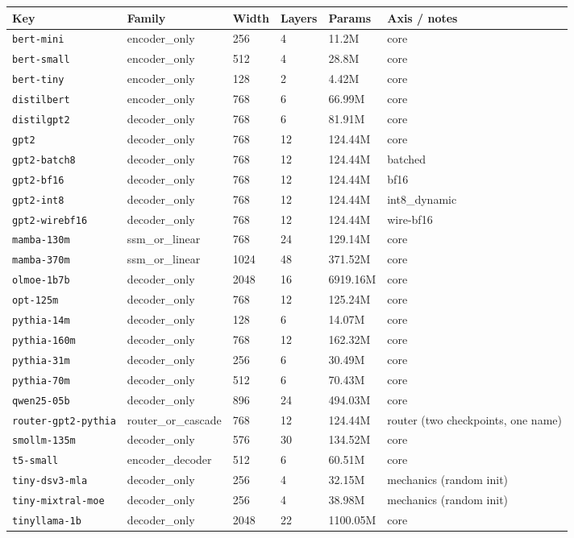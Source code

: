 \begin{tabularx}{\textwidth}{@{}l l l l l Y@{}}
\toprule
\textbf{Key} & \textbf{Family} & \textbf{Width} & \textbf{Layers} & \textbf{Params} & \textbf{Axis / notes}\\
\midrule
\texttt{bert-mini} & encoder\_only & 256 & 4 & 11.2M & core \\
\texttt{bert-small} & encoder\_only & 512 & 4 & 28.8M & core \\
\texttt{bert-tiny} & encoder\_only & 128 & 2 & 4.42M & core \\
\texttt{distilbert} & encoder\_only & 768 & 6 & 66.99M & core \\
\texttt{distilgpt2} & decoder\_only & 768 & 6 & 81.91M & core \\
\texttt{gpt2} & decoder\_only & 768 & 12 & 124.44M & core \\
\texttt{gpt2-batch8} & decoder\_only & 768 & 12 & 124.44M & batched \\
\texttt{gpt2-bf16} & decoder\_only & 768 & 12 & 124.44M & bf16 \\
\texttt{gpt2-int8} & decoder\_only & 768 & 12 & 124.44M & int8\_dynamic \\
\texttt{gpt2-wirebf16} & decoder\_only & 768 & 12 & 124.44M & wire-bf16 \\
\texttt{mamba-130m} & ssm\_or\_linear & 768 & 24 & 129.14M & core \\
\texttt{mamba-370m} & ssm\_or\_linear & 1024 & 48 & 371.52M & core \\
\texttt{olmoe-1b7b} & decoder\_only & 2048 & 16 & 6919.16M & core \\
\texttt{opt-125m} & decoder\_only & 768 & 12 & 125.24M & core \\
\texttt{pythia-14m} & decoder\_only & 128 & 6 & 14.07M & core \\
\texttt{pythia-160m} & decoder\_only & 768 & 12 & 162.32M & core \\
\texttt{pythia-31m} & decoder\_only & 256 & 6 & 30.49M & core \\
\texttt{pythia-70m} & decoder\_only & 512 & 6 & 70.43M & core \\
\texttt{qwen25-05b} & decoder\_only & 896 & 24 & 494.03M & core \\
\texttt{router-gpt2-pythia} & router\_or\_cascade & 768 & 12 & 124.44M & router (two checkpoints, one name) \\
\texttt{smollm-135m} & decoder\_only & 576 & 30 & 134.52M & core \\
\texttt{t5-small} & encoder\_decoder & 512 & 6 & 60.51M & core \\
\texttt{tiny-dsv3-mla} & decoder\_only & 256 & 4 & 32.15M & mechanics (random init) \\
\texttt{tiny-mixtral-moe} & decoder\_only & 256 & 4 & 38.98M & mechanics (random init) \\
\texttt{tinyllama-1b} & decoder\_only & 2048 & 22 & 1100.05M & core \\
\bottomrule
\end{tabularx}
